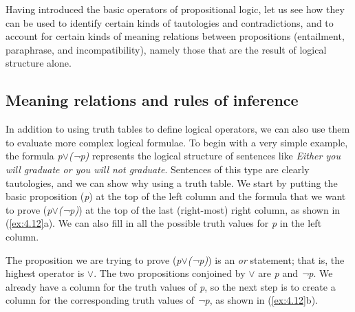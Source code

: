 Having introduced the basic operators of propositional logic, let us see how they can be used to identify certain kinds of tautologies and contradictions, and to account for certain kinds of meaning relations between propositions (entailment, paraphrase, and incompatibility), namely those that are the result of logical structure alone.


\subsection{Meaning relations and rules of inference}\label{sec:4.3.2}

In addition to using truth tables to define logical operators, we can also use them to evaluate more complex logical formulae. To begin with a very simple example, the formula \textit{p$\vee$}\textit{(¬}\textit{p)} represents the logical structure of sentences like \textit{Either you will graduate or you will not graduate}. Sentences of this type are clearly tautologies, and we can show why using a truth table. We start by putting the basic proposition (\textit{p}) at the top of the left column and the formula that we want to prove (\textit{p$\vee$}\textit{(¬}\textit{p)}) at the top of the last (right-most) right column, as shown in (\ref{ex:4.12}a). We can also fill in all the possible truth values for \textit{p} in the left column.


\ea \label{ex:4.12}
 \z

The proposition we are trying to prove (\textit{p$\vee$}\textit{(¬}\textit{p)}) is an \textit{or} statement; that is, the highest operator is $\vee$. The two propositions conjoined by $\vee$ are \textit{p} and \textit{¬p}. We already have a column for the truth values of \textit{p}, so the next step is to create a column for the corresponding truth values of \textit{¬p}, as shown in (\ref{ex:4.12}b).

\setcounter{equation}{11}

